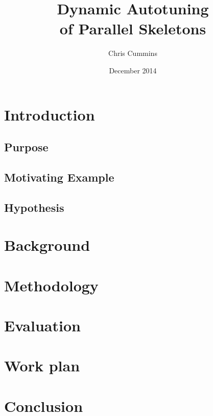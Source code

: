 
\author{Chris Cummins}

\date{December 2014}

\title{Dynamic Autotuning\\of Parallel Skeletons}

\newcommand{\subtitle}{MSc Research Proposal}

\newcommand{\degreeTitle}{MSc by Research\\ Pervasive Parallelism}

\newcommand{\institution}{School of Informatics,\\
  The University of Edinburgh}



\section{Introduction}
\subsection{Purpose}
\subsection{Motivating Example}
\subsection{Hypothesis}
\section{Background}
\section{Methodology}
\section{Evaluation}
\section{Work plan}
\section{Conclusion}



